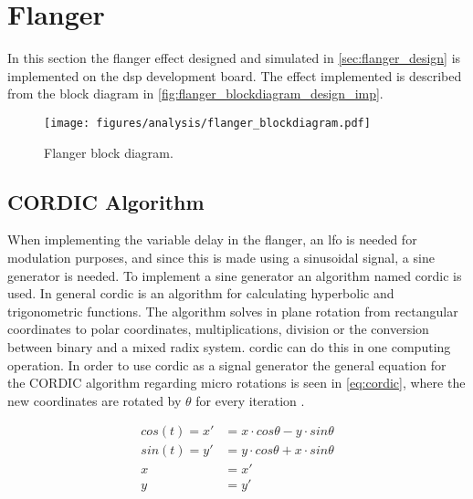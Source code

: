 \section{Flanger}
\label{sec:flanger_imp}
In this section the flanger effect designed and simulated in \autoref{sec:flanger_design} is implemented on the \gls{dsp} development board. The effect implemented is described from the block diagram in \autoref{fig:flanger_blockdiagram_design_imp}. 

\begin{figure}[htbp]
	\centering
	\texttt{[image: figures/analysis/flanger\_blockdiagram.pdf]}
	\caption{Flanger block diagram.}
	\label{fig:flanger_blockdiagram_design_imp}
\end{figure}

\subsection{CORDIC Algorithm}
When implementing the variable delay in the flanger, an \gls{lfo} is needed for modulation purposes, and since this is made using a sinusoidal signal, a sine generator is needed. To implement a sine generator an algorithm named \gls{cordic} is used. In general \gls{cordic} is an algorithm for calculating hyperbolic and trigonometric functions. The algorithm solves in plane rotation from rectangular coordinates to polar coordinates, multiplications, division or the conversion between binary and a mixed radix system. \gls{cordic} can do this in one computing operation. In order to use \gls{cordic} as a signal generator the general equation for the CORDIC algorithm regarding micro rotations is seen in \autoref{eq:cordic}, where the new coordinates are rotated by $\theta$ for every iteration \citep{CORDIC}.

\begin{equation}
\begin{split}
	cos(t)=x'&= x \cdot cos\theta - y \cdot sin\theta \\
	sin(t)=y'&= y \cdot cos\theta + x \cdot sin\theta \\
	x &= x' \\
	y &= y'
\end{split}
\label{eq:cordic}	
\end{equation}

\startexplain
\stopexplain

